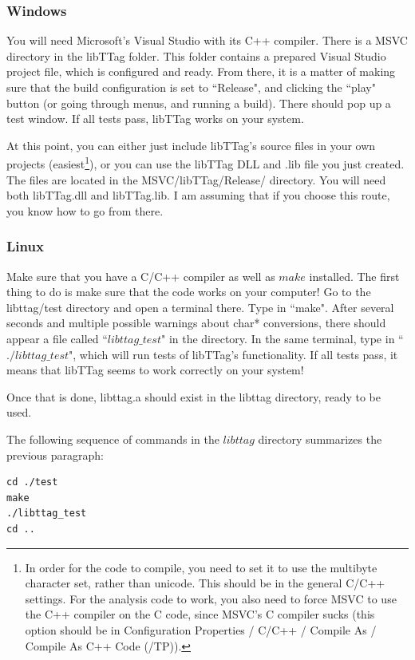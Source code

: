 \documentclass[10pt]{article}
\begin{document}
\subsubsection{Windows}
You will need Microsoft's Visual Studio with its C++ compiler. There is a MSVC directory in the libTTag folder. This folder contains a prepared 
Visual Studio project file, which is configured and ready. From there, it is a matter of making sure that the build configuration is set to ``Release",
and clicking the ``play" button (or going through menus, and running a build). There should pop up a test window. If all tests pass, libTTag works on your system.

At this point, you can either just include libTTag's source files in your own projects (easiest\footnote{In order for the code to compile, 
you need to set it to use the multibyte character set, rather than unicode. This should be in the general C/C++ settings. For the analysis code to work, you also need
to force MSVC to use the C++ compiler on the C code, since MSVC's C compiler sucks 
(this option should be in Configuration Properties / C/C++ / Compile As / Compile As C++ Code (/TP)).}), or you can use the libTTag DLL and .lib file you just created.
The files are located in the MSVC/libTTag/Release/ directory. You will need both libTTag.dll and libTTag.lib. I am assuming that if you choose this route, you
know how to go from there.


\subsubsection{Linux}
Make sure that you have a C/C++ compiler as well as $make$ installed. The first thing to do is make sure that the code works on your computer!
Go to the libttag/test directory and open a terminal there. Type in ``make". After several seconds and multiple possible warnings about char* conversions,
there should appear a file called ``$libttag\_test$" in the directory. In the same terminal, type in ``$./libttag\_test$", which will run tests of libTTag's 
functionality. If all tests pass, it means that libTTag seems to work correctly on your system!

Once that is done, libttag.a should exist in the libttag directory, ready to be used.

The following sequence of commands in the $libttag$ directory summarizes the previous paragraph:

\begin{verbatim}
cd ./test
make
./libttag_test
cd ..
\end{verbatim}
\end{document}
